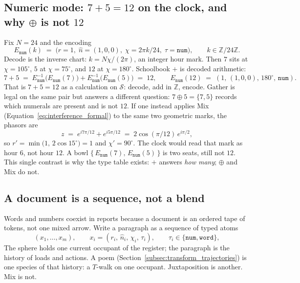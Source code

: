 \documentclass[12pt, a4paper]{article}
\begin{document}
\subsection{Numeric mode: $7+5=12$ on the clock, and why $\oplus$ is not $12$}
\label{subsec:clock_encoding}
Fix $N=24$ and the encoding
\begin{equation}
    E_{\mathtt{num}}(k)
    \;=\;
    \bigl(r=1,\;\hat n=(1,0,0),\;\chi=2\pi k/24,\;\tau=\mathtt{num}\bigr),
    \qquad
    k\in\mathbb{Z}/24\mathbb{Z}.
    \label{eq:clock_encoding}
\end{equation}
Decode is the inverse chart: $k = N\chi/(2\pi)$, an integer hour mark.
Then $7$ sits at $\chi=105^\circ$, $5$ at $\chi=75^\circ$, and $12$ at
$\chi=180^\circ$. Schoolbook $+$ is decoded arithmetic:
\begin{equation}
    7+5
    \;=\;
    E_{\mathtt{num}}^{-1}\bigl(E_{\mathtt{num}}(7)\bigr)
    +
    E_{\mathtt{num}}^{-1}\bigl(E_{\mathtt{num}}(5)\bigr)
    \;=\; 12,
    \qquad
    E_{\mathtt{num}}(12)
    \;=\;
    (1,\,(1,0,0),\,180^\circ,\,\mathtt{num}).
\end{equation}
That is $7+5=12$ as a calculation on $\mathcal{S}$: decode, add in
$\mathbb{Z}$, encode. Gather is legal on the same pair but answers a
different question: $7\oplus 5=\{7,5\}$ records which numerals are
present and is not $12$. If one instead applies Mix
(Equation~\eqref{eq:interference_formal}) to the same two geometric
marks, the phasors are
\begin{equation}
    z
    \;=\;
    e^{i 7\pi/12} + e^{i 5\pi/12}
    \;=\;
    2\cos(\pi/12)\,e^{i\pi/2},
\end{equation}
so $r'=\min\bigl(1,\,2\cos 15^\circ\bigr)=1$ and $\chi'=90^\circ$.
The clock would read that mark as hour $6$, not hour $12$.
A bowl $\{\,E_{\mathtt{num}}(7),\,E_{\mathtt{num}}(5)\,\}$ is two seats,
still not $12$. This single contrast is why the type table exists:
$+$ answers \emph{how many}; $\oplus$ and Mix do not.

\subsection{A document is a sequence, not a blend}
\label{subsec:document_sequence}
Words and numbers coexist in reports because a document is an ordered
tape of tokens, not one mixed arrow. Write a paragraph as a sequence
of typed atoms
\begin{equation}
    (x_1,\ldots,x_m),
    \qquad
    x_i=(r_i,\,\hat n_i,\,\chi_i,\,\tau_i),
    \qquad
    \tau_i\in\{\mathtt{num},\mathtt{word}\},
    \label{eq:mixed_document}
\end{equation}
The sphere holds one current occupant of the register; the paragraph is the history of
loads and actions. A poem
(Section~\ref{subsec:transform_trajectories}) is one species of that
history: a $T$-walk on one occupant. Juxtaposition is another. Mix is
not.
\end{document}
